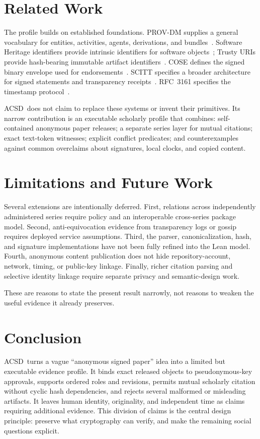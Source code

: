 \documentclass[11pt]{article}
\newcommand{\acsd}{\textsc{ACSD}}
\begin{document}
\section{Related Work}

The profile builds on established foundations. PROV-DM supplies a general vocabulary for entities, activities, agents, derivations, and bundles~\cite{prov}. Software Heritage identifiers provide intrinsic identifiers for software objects~\cite{swhid}; Trusty URIs provide hash-bearing immutable artifact identifiers~\cite{trusty}. COSE defines the signed binary envelope used for endorsements~\cite{cose}. SCITT specifies a broader architecture for signed statements and transparency receipts~\cite{scitt}. RFC~3161 specifies the timestamp protocol~\cite{rfc3161}.

\acsd\ does not claim to replace these systems or invent their primitives. Its narrow contribution is an executable scholarly profile that combines: self-contained anonymous paper releases; a separate series layer for mutual citations; exact text-token witnesses; explicit conflict predicates; and counterexamples against common overclaims about signatures, local clocks, and copied content.

\section{Limitations and Future Work}

Several extensions are intentionally deferred. First, relations across independently administered series require policy and an interoperable cross-series package model. Second, anti-equivocation evidence from transparency logs or gossip requires deployed service assumptions. Third, the parser, canonicalization, hash, and signature implementations have not been fully refined into the Lean model. Fourth, anonymous content publication does not hide repository-account, network, timing, or public-key linkage. Finally, richer citation parsing and selective identity linkage require separate privacy and semantic-design work.

These are reasons to state the present result narrowly, not reasons to weaken the useful evidence it already preserves.

\section{Conclusion}

\acsd\ turns a vague ``anonymous signed paper'' idea into a limited but executable evidence profile. It binds exact released objects to pseudonymous-key approvals, supports ordered roles and revisions, permits mutual scholarly citation without cyclic hash dependencies, and rejects several malformed or misleading artifacts. It leaves human identity, originality, and independent time as claims requiring additional evidence. This division of claims is the central design principle: preserve what cryptography can verify, and make the remaining social questions explicit.
\end{document}
